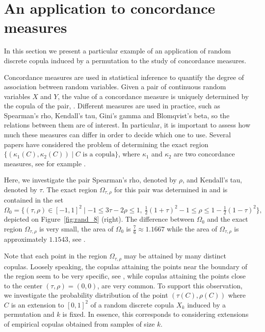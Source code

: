 \documentclass[12pt,a4paper]{amsart}
\theoremstyle{definition}
\begin{document}
\section{An application to concordance measures} \label{se:simulation}

In this section we present a particular example of an application of random discrete copula induced by a permutation to the study of concordance measures.

Concordance measures are used in statistical inference to quantify the degree of association between random variables.
Given a pair of continuous random variables $X$ and $Y$, the value of a concordance measure is uniquely determined by the copula of the pair, \cite{Kr58,Li14}.
Different measures are used in practice, such as Spearman's rho, Kendall's tau, Gini's gamma and Blomqvist's beta, so the relations between them are of interest. In particular, it is important to assess how much these measures can differ in order to decide which one to use.
Several papers have considered the problem of determining the exact region $\{(\kappa_1(C),\kappa_2(C)) \mid C \text{ is a copula}\}$, where $\kappa_1$ and $\kappa_2$ are two concordance measures, see for example \cite{ScPaTr17,KoBuSt23}.

Here, we investigate the pair Spearman's rho, denoted by $\rho$, and Kendall's tau, denoted by $\tau$. The exact region $\Omega_{\tau,\rho}$ for this pair was determined in \cite{ScPaTr17} and is contained in the set
$$\Omega_0=\{(\tau,\rho) \in [-1,1]^2 \mid -1 \le 3\tau-2\rho \le 1,\ \tfrac{1}{2}(1+\tau)^2-1 \le \rho \le 1-\tfrac{1}{2}(1-\tau)^2\},$$
depicted on Figure~\ref{fig:rand_8} (right).
The difference between $\Omega_0$ and the exact region $\Omega_{\tau,\rho}$ is very small, the area of $\Omega_0$ is $\tfrac{7}{6} \approx 1.1667$ while the area of $\Omega_{\tau,\rho}$ is approximately $1.1543$, see \cite{KoBuMo22}.

Note that each point in the region $\Omega_{\tau,\rho}$ may be attained by many distinct copulas.
Loosely speaking, the copulas attaining the points near the boundary of the region seem to be very specific, see \cite{ScPaTr17}, while copulas attaining the points close to the center $(\tau,\rho)=(0,0)$, are very common.
To support this observation, we investigate the probability distribution of the point $(\tau(C),\rho(C))$ where $C$ is an extension to $[0,1]^2$ of a random discrete copula $X_k$ induced by a permutation and $k$ is fixed.
In essence, this corresponds to considering extensions of empirical copulas obtained from samples of size $k$.
\end{document}
